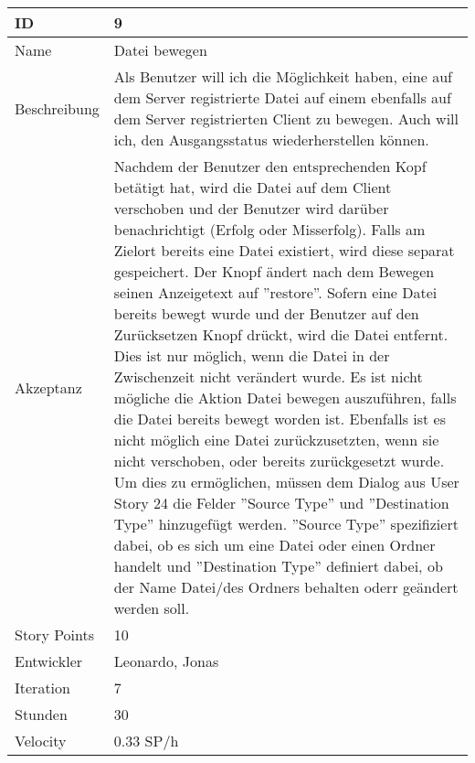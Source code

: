 \begin{table}[htbp]
    \begin{minipage}{\linewidth}
        \setlength{\tymax}{0.5\linewidth}
        \centering
        \small
        \begin{tabulary}{\textwidth}{|l|p{10cm}|} \hline
            ID   &9\\\hline
            Name  &Datei bewegen\\\hline
	    Beschreibung&Als Benutzer will ich die Möglichkeit haben, eine auf dem Server registrierte Datei auf einem ebenfalls auf dem Server registrierten Client zu bewegen. 
	    Auch will ich, den Ausgangsstatus wiederherstellen können.\\\hline
            Akzeptanz &Nachdem der Benutzer den entsprechenden Kopf betätigt hat, wird die Datei auf dem Client verschoben und der Benutzer wird darüber benachrichtigt (Erfolg oder Misserfolg). Falls am Zielort bereits eine Datei existiert, wird diese separat gespeichert. Der Knopf ändert nach dem Bewegen seinen Anzeigetext auf ''restore''. Sofern eine Datei bereits bewegt wurde und der Benutzer auf den Zurücksetzen Knopf drückt, wird die Datei entfernt. Dies ist nur möglich, wenn die Datei in der Zwischenzeit nicht verändert wurde. Es ist nicht mögliche die Aktion Datei bewegen auszuführen, falls die Datei bereits bewegt worden ist. Ebenfalls ist es nicht möglich eine Datei zurückzusetzten, wenn sie nicht verschoben, oder bereits zurückgesetzt wurde.
	    Um dies zu ermöglichen, müssen dem Dialog aus User Story 24 die Felder ''Source Type'' und ''Destination Type'' hinzugefügt werden. ''Source Type'' spezifiziert dabei, ob es sich um eine Datei oder einen Ordner handelt und ''Destination Type'' definiert dabei, ob der Name Datei/des Ordners behalten oderr geändert werden soll.\\\hline
            Story Points&10\\\hline
            Entwickler &Leonardo, Jonas\\\hline
            Iteration &7\\\hline
            Stunden  &30\\\hline
            Velocity &0.33 SP\slash h\\\hline
        \end{tabulary}
    \end{minipage}
\end{table}




